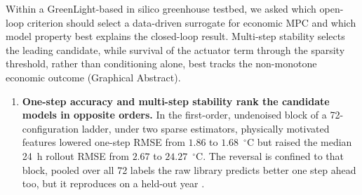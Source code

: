 Within a GreenLight-based in silico greenhouse testbed, we asked which open-loop
criterion should select a data-driven surrogate for economic MPC and which model
property best explains the closed-loop result. Multi-step stability selects the
leading candidate, while survival of the actuator term through the sparsity
threshold, rather than conditioning alone, best tracks the non-monotone economic
outcome (Graphical Abstract).

\begin{enumerate}

\item \textbf{One-step accuracy and multi-step stability rank the candidate
models in opposite orders.} In the first-order, undenoised block of a
72-configuration ladder, under two sparse estimators, physically motivated
features lowered one-step RMSE from $1.86$ to $1.68$~$^\circ$C but raised
the median 24~h rollout RMSE from $2.67$ to $24.27$~$^\circ$C. The reversal
is confined to that block, pooled over all 72 labels the raw library predicts better one step ahead too, but it reproduces on a held-out year
\cite{lambert2020,wei2024,gevers1993,vandenhof1995,yonezawa2026}.


\end{enumerate}
